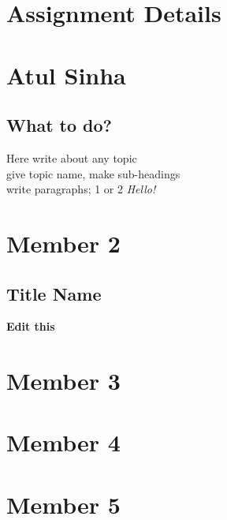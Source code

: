 \documentclass[a4paper,12pt]{article}
\begin{document}
\newpage
\section*{Assignment Details}
\lipsum[1-2] %


\newpage
\tableofcontents


\newpage
\section{Atul Sinha}
\subsection{What to do?}
\Large Here write about any topic\\ give topic name, make sub-headings\\ write paragraphs; 1 or 2 
\vspace{0.3in}
\newline
\textit{\normalsize Hello!}



\newpage
\section{Member 2}
\subsection{Title Name}
\vspace{0.2in}
\hspace{1in}
\textbf{Edit this}


\newpage
\section{Member 3}


\newpage
\section{Member 4}


\newpage
\section{Member 5}
\end{document}
